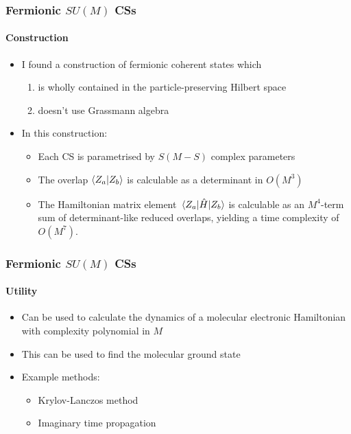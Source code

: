 \documentclass[english]{beamer}
\begin{document}
  
  \begin{frame}
  	\frametitle{Fermionic $SU(M)$ CSs}
  	\framesubtitle{Construction}
  	\begin{itemize}
  		\item I found a construction of fermionic coherent states which
  		\begin{enumerate}
  			\item is wholly contained in the particle-preserving Hilbert space
  			\item doesn't use Grassmann algebra
  		\end{enumerate}
  		\item In this construction:
  		\begin{itemize}
  			\item Each CS is parametrised by $S(M-S)$ complex parameters
  			\item The overlap $\braket{Z_a}{Z_b}$ is calculable as a determinant in $O(M^3)$
  			\item The Hamiltonian matrix element $\mel{Z_a}{\hat{H}}{Z_b}$ is calculable as an $M^4$-term sum of determinant-like reduced overlaps, yielding a time complexity of $O(M^7)$.
  		\end{itemize}
  	\end{itemize}
  \end{frame}
  
  
  \begin{frame}
  	\frametitle{Fermionic $SU(M)$ CSs}
  	\framesubtitle{Utility}
  	\begin{itemize}
  		\item Can be used to calculate the dynamics of a molecular electronic Hamiltonian with complexity polynomial in $M$
  		\item This can be used to find the molecular ground state
  		\item Example methods:
  		\begin{itemize}
  			\item Krylov-Lanczos method
  			\item Imaginary time propagation
  		\end{itemize}
  	\end{itemize}
  \end{frame}
  
\end{document}
